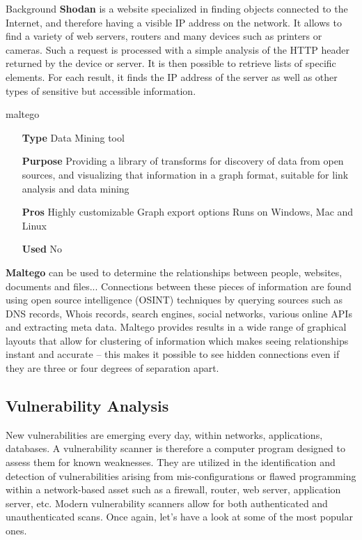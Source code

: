 \begin{chaptercover}{Background}
\textbf{Shodan} \cite{shodan} is a website specialized in finding objects connected to the Internet, and therefore having a visible IP address on the network. It allows to find a variety of web servers, routers and many devices such as printers or cameras. Such a request is processed with a simple analysis of the HTTP header returned by the device or server. It is then possible to retrieve lists of specific elements. For each result, it finds the IP address of the server as well as other types of sensitive but accessible information.

\begin{solutiondata}{maltego}
\begin{itemize}[labelsep=1cm]
  \item [\textbf{Type}] Data Mining tool
  \item [\textbf{Purpose}] Providing a library of transforms for discovery of data from open sources, and visualizing that information in a graph format, suitable for link analysis and data mining
  \item [\textbf{Pros}] Highly customizable \newline Graph export options \newline Runs on Windows, Mac and Linux
  \item [\textbf{Used}] No
\end{itemize}
\end{solutiondata}

\textbf{Maltego} \cite{maltego} can be used to determine the relationships between people, websites, documents and files... Connections between these pieces of information are found using open source intelligence (OSINT) techniques by querying sources such as DNS records, Whois records, search engines, social networks, various online APIs and extracting meta data. Maltego provides results in a wide range of graphical layouts that allow for clustering of information which makes seeing relationships instant and accurate – this makes it possible to see hidden connections even if they are three or four degrees of separation apart.

\subsection{Vulnerability Analysis}

New vulnerabilities are emerging every day, within networks, applications, databases. A vulnerability scanner is therefore a computer program designed to assess them for known weaknesses. They are utilized in the identification and detection of vulnerabilities arising from mis-configurations or flawed programming within a network-based asset such as a firewall, router, web server, application server, etc. Modern vulnerability scanners allow for both authenticated and unauthenticated scans. Once again, let’s have a look at some of the most popular ones.


\end{chaptercover}

